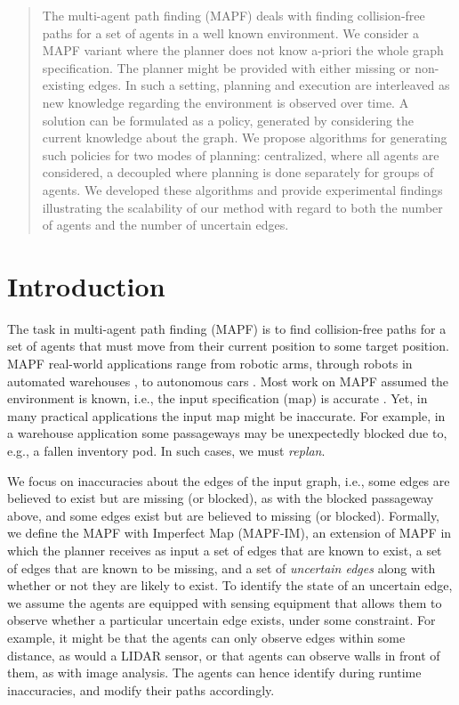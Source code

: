 \documentclass[letterpaper]{article} %
\def\
UrlFont{\rm}  %
\theoremstyle{definition}
\begin{document}
\begin{abstract}
{The multi-agent path finding (MAPF) deals with finding collision-free paths for a set of agents in a well known environment. We consider a MAPF variant where the planner does not know a-priori the whole graph specification. The planner might be provided with either missing or non-existing edges. In such a setting, planning and execution are interleaved as new knowledge regarding the environment is observed over time. A solution can be formulated as a policy, generated by considering the current knowledge about the graph. We propose algorithms for generating such policies for two modes of planning: centralized, where all agents are considered, a decoupled where planning is done separately for groups of agents. We developed these algorithms and provide experimental findings illustrating the scalability of our method with regard to both the number of agents and the number of uncertain edges.
}

\end{abstract}

\section{Introduction}

The task in multi-agent path finding (MAPF) is to find collision-free paths for a set of agents that must move from their current position to some target position. MAPF real-world applications range from robotic arms, through robots in automated warehouses \cite{wurman2008coordinating}, to autonomous cars \cite{veloso2015cobots}.
Most work on MAPF assumed the environment is known, i.e., the input specification (map) is accurate \cite{stern2019multi}.
Yet, in many practical applications the input map might be inaccurate. For example, in a warehouse application some passageways may be unexpectedly blocked due to, e.g., a fallen inventory pod.
In such cases, we must {\em replan}. %


We focus on inaccuracies about the edges of the input graph, i.e., some edges are believed to exist but are missing (or blocked), as with the blocked passageway above, and some edges exist but are believed to missing (or blocked). %
Formally, we define the MAPF with Imperfect Map (MAPF-IM), an extension of MAPF in which the planner receives as input a set of edges that are known to exist, a set of edges that are known to be missing, and a set of \emph{uncertain edges} along with whether or not they are likely to exist. To identify the state of an uncertain edge, we assume the agents are equipped with sensing equipment that allows them to observe whether a particular uncertain edge exists, under some constraint. For example, it might be that the agents can only observe edges within some distance, as would a LIDAR sensor, or that agents can observe walls in front of them, as with image analysis. The agents can hence identify during runtime inaccuracies, and modify their paths accordingly.
\end{document}
